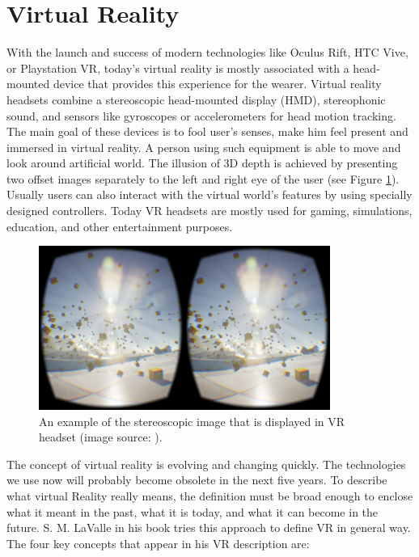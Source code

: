 \section{Virtual Reality}

With the launch and success of modern technologies like Oculus Rift, HTC Vive, or Playstation VR, today’s virtual reality is mostly associated with a head-mounted device that provides this experience for the wearer. Virtual reality headsets combine a stereoscopic head-mounted display (HMD), stereophonic sound, and sensors like gyroscopes or accelerometers for head motion tracking. The main goal of these devices is to fool user’s senses, make him feel present and immersed in virtual reality. A person using such equipment is able to move and look around artificial world. The illusion of 3D depth is achieved by presenting two offset images separately to the left and right eye of the user (see Figure \ref{fig:STEREOSCOPIC}). Usually users can also interact with the virtual world's features by using specially designed controllers. Today VR headsets are mostly used for gaming, simulations, education, and other entertainment purposes.

\begin{figure}[th]
\centering
\includegraphics[width=0.85\textwidth]{img/stereoscopic.jpg}
\caption{An example of the stereoscopic image that is displayed in VR headset (image source: \cite{STEREOSCOPIC_IMAGE}).}
\label{fig:STEREOSCOPIC}
\end{figure}

The concept of virtual reality is evolving and changing quickly. The technologies we use now will probably become obsolete in the next five years. To describe what virtual Reality really means, the definition must be broad enough to enclose what it meant in the past, what it is today, and what it can become in the future. S. M. LaValle in his book \cite{VR_BOOK} tries this approach to define VR in general way. The four key concepts that appear in his VR description are:


